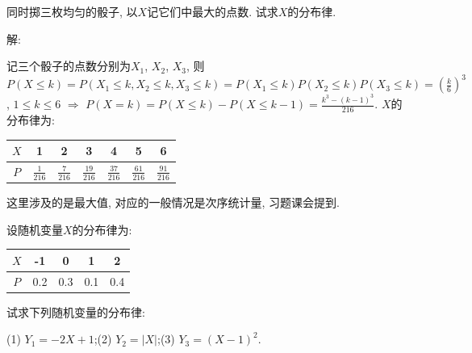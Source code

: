 \documentclass[standard]{ExBook}
\begin{document}
\begin{qitems}
\vspace{-5em}

    \begin{bbox}
    \begin{shaded}
        \qitem
同时掷三枚均匀的骰子, 以$X$记它们中最大的点数. 试求$X$的分布律.
    \end{shaded}
    \end{bbox}

\vspace{-5em}

    \begin{bbox}
解: 

记三个骰子的点数分别为$X_1$, $X_2$, $X_3$, 则$P(X\leq k)=P(X_1\leq k,X_2\leq k,X_3\leq k)=P(X_1\leq k)P(X_2\leq k)P(X_3\leq k)=\left(\frac{k}{6}\right)^3$, $1\leq k\leq 6$ $\Longrightarrow$ $P(X=k)=P(X\leq k)-P(X\leq k-1)=\frac{k^3-(k-1)^3}{216}$. $X$的分布律为:
\begin{center}
\begin{tabular}{c|cccccc}
    \hline
    $X$ & 1 & 2 & 3 & 4 & 5 & 6 \\
    \hline
    $P$ & $\frac{1}{216}$ & $\frac{7}{216}$ & $\frac{19}{216}$ & $\frac{37}{216}$ & $\frac{61}{216}$ & $\frac{91}{216}$ \\
    \hline
\end{tabular}
\end{center}

\textcolor{themeColor}{\selectfont {} 这里涉及的是最大值, 对应的一般情况是次序统计量, 习题课会提到.}
    \end{bbox}

\vspace{-5em}

    \begin{bbox}
    \begin{shaded}
        \qitem
设随机变量$X$的分布律为:
\begin{center}
\begin{tabular}{c|cccc}
$X$ & -1 & 0 & 1 & 2\\
\hline
$P$ & 0.2 & 0.3 & 0.1 & 0.4\\
\end{tabular}
\end{center}
试求下列随机变量的分布律: 

(1) $Y_{1}=-2X+1$;\qquad(2) $Y_{2}=|X|$;\qquad(3) $Y_{3}=(X-1)^2$.
    \end{shaded}
    \end{bbox}

\vspace{-5em}


\end{qitems}
\end{document}
